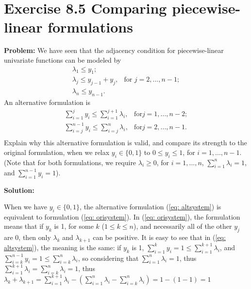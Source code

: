 \section{Exercise 8.5 Comparing piecewise-linear formulations}
\textbf{Problem:} We have seen that the adjacency condition for piecewise-linear univariate functions can be modeled by
\begin{equation}
\label{eq: orisystem}
  \begin{array}{lrcll}
    \lambda_1\leq{}y_1; &\\
    \lambda_j\leq{}y_{j-1}+y_j, & \text{for } j=2,...,n-1;\\
    \lambda_n\leq{}y_{n-1}. &
  \end{array}
\end{equation}
An alternative formulation is
\begin{equation}
\label{eq: altsystem}
  \begin{array}{lrcll}
   \sum_{i=1}^{j} y_i\leq{}\sum_{i=1}^{j+1} \lambda_i, & \text{for} j=1,...,n-2;\\
   \sum_{i=j}^{n-1} y_i\leq{}\sum_{i=j}^{n} \lambda_i, & \text{for} j=2,...,n-1.\\
  \end{array}
\end{equation}
Explain why this alternative formulation is valid, and compare its strength to the original formulation, when we relax $y_i\in\lbrace0,1\rbrace$ to $0\leq{}y_i\leq1$, for $i=1,...,n−1$. (Note that for both formulations, we require $\lambda_i\geq0$, for $i=1,...,n$, $\sum_{i=1}^{n} \lambda_i=1$, and
$\sum_{i=1}^{n-1} y_i=1$).

\textbf{Solution:} 

When we have $y_i\in\lbrace0,1\rbrace$, the alternative formulation (\ref{eq: altsystem}) is equivalent to formulation (\ref{eq: orisystem}). In (\ref{eq: orisystem}), the formulation means that if $y_k$ is 1, for some $k$ ($1\leq{}k\leq{}n$), and necessarily all of the other $y_j$ are 0, then only $\lambda_k$ and $\lambda_{k+1}$ can be positive. It is easy to see that in (\ref{eq: altsystem}), the meaning is the same: if $y_k$ is 1, $ \sum_{i=1}^{k} y_i=1\leq{}\sum_{i=1}^{k+1} \lambda_i$, and $\sum_{i=k}^{n-1} y_i=1\leq{}\sum_{i=k}^{n} \lambda_i$, so considering that $\sum_{i=1}^{n} \lambda_i=1$, thus $\sum_{i=1}^{k+1} \lambda_i=\sum_{i=k}^{n} \lambda_i=1$, thus $\lambda_k + \lambda_{k+1}=\sum_{i=1}^{k+1} \lambda_i - (\sum_{i=1}^{n} \lambda_i-\sum_{i=k}^{n} \lambda_i)=1-(1-1)=1$
